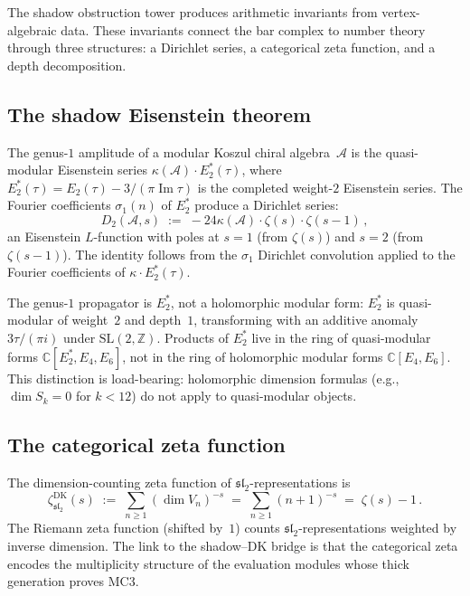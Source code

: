 \documentclass[11pt,reqno]{amsart}
\theoremstyle{definition}
\theoremstyle{remark}
\providecommand{\cA}{\mathcal{A}}
\numberwithin{equation}{section}
\begin{document}
The shadow obstruction tower produces arithmetic invariants
from vertex-algebraic data. These invariants connect the
bar complex to number theory through three structures: a
Dirichlet series, a categorical zeta function, and a depth
decomposition.

\subsection{The shadow Eisenstein theorem}
\label{ssec:eisenstein}

The genus-$1$ amplitude of a modular Koszul chiral
algebra~$\cA$ is the quasi-modular Eisenstein series
$\kappa(\cA) \cdot E_2^*(\tau)$, where
$E_2^*(\tau) = E_2(\tau) - 3/(\pi \operatorname{Im}\tau)$
is the completed weight-$2$ Eisenstein series. The
Fourier coefficients $\sigma_1(n)$ of $E_2^*$ produce
a Dirichlet series:
\begin{equation}\label{eq:dirichlet-series}
D_2(\cA, s)
\;:=\;
-24\kappa(\cA) \cdot
\zeta(s) \cdot \zeta(s - 1)\,,
\end{equation}
an Eisenstein $L$-function with poles at $s = 1$ (from
$\zeta(s)$) and $s = 2$ (from $\zeta(s-1)$). The identity
follows from the $\sigma_1$ Dirichlet convolution applied to
the Fourier coefficients of $\kappa \cdot E_2^*(\tau)$.

The genus-$1$ propagator is $E_2^*$, not a holomorphic
modular form: $E_2^*$ is quasi-modular of weight~$2$ and
depth~$1$, transforming with an additive anomaly
$3\tau/(\pi i)$ under $\mathrm{SL}(2,\mathbb{Z})$.
Products of $E_2^*$ live in the ring of quasi-modular
forms $\mathbb{C}[E_2^*, E_4, E_6]$, not in the ring of
holomorphic modular forms $\mathbb{C}[E_4, E_6]$. This
distinction is load-bearing: holomorphic dimension formulas
(e.g., $\dim S_k = 0$ for $k < 12$) do not apply to
quasi-modular objects.


\subsection{The categorical zeta function}
\label{ssec:categorical-zeta}

The dimension-counting zeta function of
$\mathfrak{sl}_2$-representations is
\begin{equation}\label{eq:cat-zeta}
\zeta^{\mathrm{DK}}_{\mathfrak{sl}_2}(s)
\;:=\;
\sum_{n \ge 1} (\dim V_n)^{-s}
\;=\;
\sum_{n \ge 1}(n+1)^{-s}
\;=\;
\zeta(s) - 1\,.
\end{equation}
The Riemann zeta function (shifted by~$1$) counts
$\mathfrak{sl}_2$-representations weighted by inverse
dimension. The link to the shadow--DK bridge is that
the categorical zeta encodes the multiplicity structure
of the evaluation modules whose thick generation proves
MC3.
\end{document}
